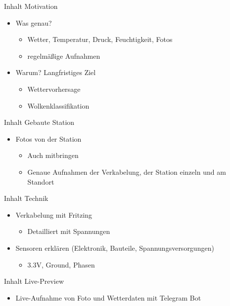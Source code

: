 \begin{frame}[t]{Inhalt Motivation}
  \begin{itemize}[label=+]
    \item Was genau?
      \begin{itemize}[label=-]
        \item Wetter, Temperatur, Druck, Feuchtigkeit, Fotos
        \item regelmäßige Aufnahmen
      \end{itemize}
    \item Warum? Langfristiges Ziel
      \begin{itemize}[label=-]
        \item Wettervorhersage
        \item Wolkenklassifikation
      \end{itemize}
  \end{itemize}
\end{frame}
\begin{frame}[t]{Inhalt Gebaute Station}
  \begin{itemize}[label=+]
    \item Fotos von der Station
      \begin{itemize}[label=-]
        \item Auch mitbringen
        \item Genaue Aufnahmen der Verkabelung, der Station einzeln und am Standort
      \end{itemize}
  \end{itemize}
\end{frame}
\begin{frame}[t]{Inhalt Technik}
  \begin{itemize}[label=+]
    \item Verkabelung mit Fritzing
      \begin{itemize}
        \item Detailliert mit Spannungen
      \end{itemize}
    \item Sensoren erklären (Elektronik, Bauteile, Spannungsversorgungen)
      \begin{itemize}
        \item 3.3V, Ground, Phasen
      \end{itemize}
  \end{itemize}
\end{frame}
\begin{frame}[t]{Inhalt Live-Preview}
  \begin{itemize}[label=+]
    \item Live-Aufnahme von Foto und Wetterdaten mit Telegram Bot
  \end{itemize}
\end{frame}
